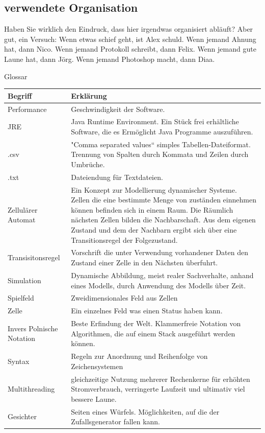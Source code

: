 \documentclass[11pt,a4paper]{article}
\begin{document}
\subsection{verwendete Organisation}
Haben Sie wirklich den Eindruck, dass hier irgendwas organisiert abläuft? 
Aber gut, ein Versuch: 
Wenn etwas schief geht, ist Alex schuld.
Wenn jemand Ahnung hat, dann Nico.
Wenn jemand Protokoll schreibt, dann Felix.
Wenn jemand gute Laune hat, dann Jörg.
Wenn jemand Photoshop macht, dann Diaa.

\pagebreak


\par
Glossar
\par
\begin{longtable}[m]{|m{8cm}|m{8cm}|}
\hline
Begriff & Erklärung \\
    \hline
  Performance   & Geschwindigkeit der Software. \\
  \hline
JRE  & Java Runtime Environment. Ein Stück frei erhältliche Software, die es Ermöglicht Java Programme auszuführen. \\
    \hline
.csv  & "Comma separated values“ simples Tabellen-Dateiformat. Trennung von Spalten durch Kommata und Zeilen durch Umbrüche. \\
    \hline
.txt  & Dateiendung für Textdateien.\\
    \hline
 Zellulärer Automat & Ein Konzept zur Modellierung dynamischer Systeme.
Zellen die eine bestimmte Menge von zuständen einnehmen können befinden sich in einem Raum. Die Räumlich nächsten Zellen bilden die Nachbarschaft. Aus dem eigenen Zustand und dem der Nachbarn ergibt sich über eine Transitionsregel der Folgezustand.
\\
    \hline
 Transisitonsregel & Vorschrift die unter Verwendung vorhandener Daten den Zustand einer Zelle in den Nächsten überfuhrt.\\  
  \hline
 Simulation & Dynamische Abbildung, meist realer Sachverhalte, anhand eines Modells, durch Anwendung des Modells über Zeit.\\
  \hline
  Spielfeld & Zweidimensionales Feld aus Zellen\\
  \hline
  Zelle & Ein einzelnes Feld was einen Status haben kann.\\
  \hline
  Invers Polnische Notation & Beste Erfindung der Welt. Klammerfreie Notation von Algorithmen, die auf einem Stack ausgeführt werden können.\\
  \hline
  Syntax & Regeln zur Anordnung und Reihenfolge von Zeichensystemen\\
  \hline
  Multithreading & gleichzeitige Nutzung mehrerer Rechenkerne für erhöhten Stromverbrauch, verringerte Laufzeit und ultimativ viel bessere Laune.\\
 \hline
 Gesichter & Seiten eines Würfels. Möglichkeiten, auf die der Zufallsgenerator fallen kann.\\
 \hline
\end{longtable}
\end{document}
